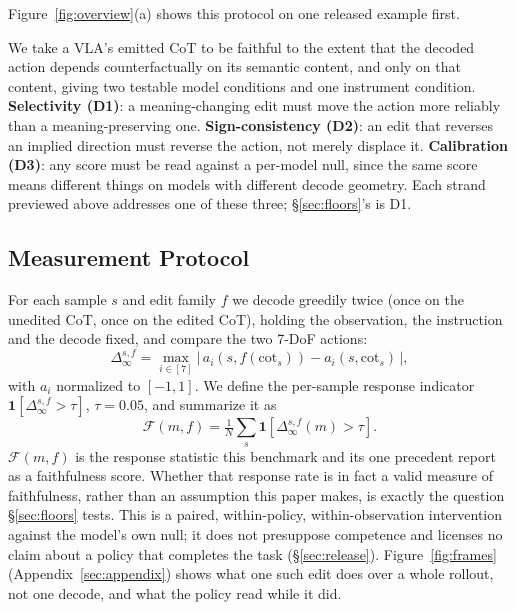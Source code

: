 \documentclass{article}
\begin{document}
Figure~\ref{fig:overview}(a) shows this protocol on one released example first.

We take a VLA's emitted CoT to be faithful to the extent that the decoded action depends counterfactually on its semantic content, and only on that content, giving two testable model conditions and one instrument condition. \textbf{Selectivity (D1)}: a meaning-changing edit must move the action more reliably than a meaning-preserving one. \textbf{Sign-consistency (D2)}: an edit that reverses an implied direction must reverse the action, not merely displace it. \textbf{Calibration (D3)}: any score must be read against a per-model null, since the same score means different things on models with different decode geometry. Each strand previewed above addresses one of these three; \S\ref{sec:floors}'s is D1.

\subsection{Measurement Protocol}

For each sample $s$ and edit family $f$ we decode greedily twice (once on the unedited CoT, once on the edited CoT), holding the observation, the instruction and the decode fixed, and compare the two 7-DoF actions:
\begin{equation}
\Delta_\infty^{s,f} = \max_{i \in [7]}\bigl|\,a_i(s, f(\text{cot}_s)) - a_i(s, \text{cot}_s)\,\bigr|,
\label{eq:delta}
\end{equation}
with $a_i$ normalized to $[-1,1]$. We define the per-sample response indicator $\mathbf{1}[\Delta_\infty^{s,f} > \tau]$, $\tau = 0.05$, and summarize it as
\begin{equation}
\mathcal{F}(m,f) = \tfrac{1}{N}\textstyle\sum_s \mathbf{1}[\Delta_\infty^{s,f}(m) > \tau].
\label{eq:faith}
\end{equation}
$\mathcal{F}(m,f)$ is the response statistic this benchmark and its one precedent report as a faithfulness score. Whether that response rate is in fact a valid measure of faithfulness, rather than an assumption this paper makes, is exactly the question \S\ref{sec:floors} tests.
This is a paired, within-policy, within-observation intervention against the model's own null; it does not presuppose competence and licenses no claim about a policy that completes the task (\S\ref{sec:release}). Figure~\ref{fig:frames} (Appendix~\ref{sec:appendix}) shows what one such edit does over a whole rollout, not one decode, and what the policy read while it did.
\end{document}
